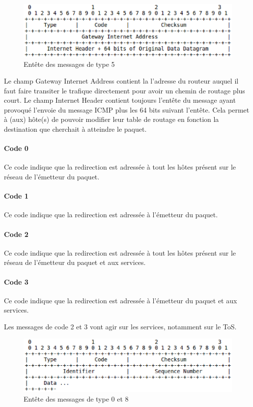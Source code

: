 \begin{figure}[h]
\centering
\includegraphics[width=15cm]{./pics/header2.eps}
\caption{Entête des messages de type 5}
\label{fig:head2icmp}
\end{figure}
Le champ Gateway Internet Address contient la l'adresse du routeur auquel il
faut faire transiter le trafique directement pour avoir un chemin de routage
plus court.  Le champ Internet Header contient toujours l'entête du message
ayant provoqué l'envoie du message ICMP plus les 64 bits suivant l'entête. Cela
permet à (aux) hôte(s) de pouvoir modifier leur table de routage en fonction la
destination que cherchait à atteindre le paquet.

\paragraph{Code 0}
Ce code indique que la redirection est adressée à tout les hôtes présent sur le
réseau de l'émetteur du paquet.

\paragraph{Code 1}
Ce code indique que la redirection est adressée à l'émetteur du paquet.

\paragraph{Code 2}
Ce code indique que la redirection est adressée à tout les hôtes présent sur le
réseau de l'émetteur du paquet et aux services.

\paragraph{Code 3} Ce code indique que la redirection est adressée à l'émetteur
du paquet et aux services.

Les messages de code 2 et 3 vont agir sur les services, notamment sur le ToS.

\begin{figure}[h]
\centering
\includegraphics[width=15cm]{./pics/header3.eps}
\caption{Entête des messages de type 0 et 8}
\label{fig:head3icmp}
\end{figure}

